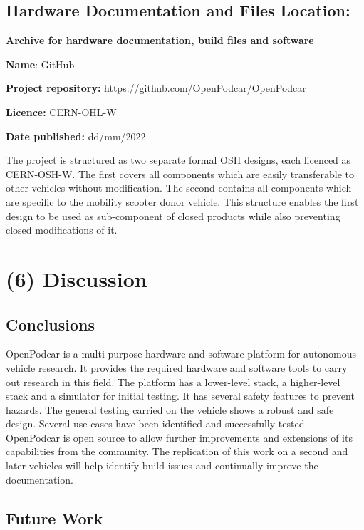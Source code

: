 \documentclass[a4paper]{article}
\begin{document}
	\subsection{Hardware Documentation and Files Location:}\label{h.nbisrsde6sc3}
	
	\textbf{Archive for hardware documentation, build files and software}
	
	\textbf{Name}: GitHub
	
	
	\textbf{Project repository:} \url{https://github.com/OpenPodcar/OpenPodcar}
	
	\textbf{Licence:} CERN-OHL-W 
	
	\textbf{Date published:} dd/mm/2022
	
	The project is structured as two separate formal OSH designs, each licenced as CERN-OSH-W. The first covers all components which are easily transferable to other vehicles without modification. The second contains all components which are specific to the mobility scooter donor vehicle. This structure enables the first design to be used as sub-component of closed products while also preventing closed modifications of it.
	
	
	\section{(6) Discussion}\label{h.90jl7wm65t65}
	
	\subsection{Conclusions}\label{h.h3fr33ylzsnh}
	
	OpenPodcar is a multi-purpose hardware and software platform for autonomous vehicle research. It provides the required hardware and software tools to carry out research in this field. The platform has a lower-level stack, a higher-level stack and a simulator for initial testing. It has several safety features to prevent hazards. The general testing carried on the vehicle shows a robust and safe design. Several use cases have been identified and successfully tested. OpenPodcar is open source to allow further improvements and extensions of its capabilities from the community. The replication of this work on a second and later vehicles will help identify build issues and continually improve the documentation.
	
	\subsection{Future Work}\label{h.neocsr410zj}
	
\end{document}
